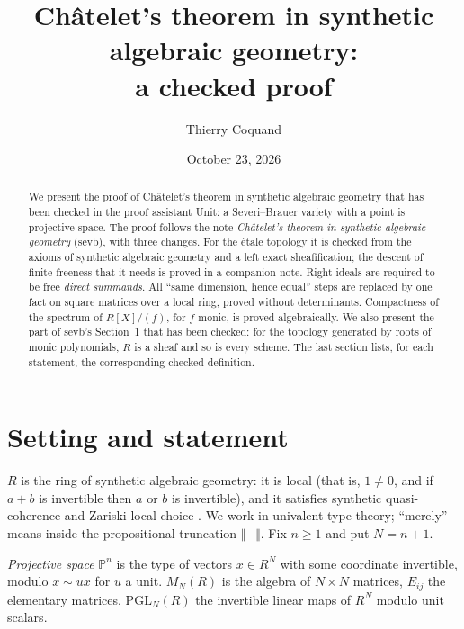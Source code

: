 \documentclass[11pt]{amsart}
\title{Ch\^atelet's theorem in synthetic algebraic geometry:\\ a checked proof}
\author{Thierry Coquand}
\date{October 23, 2026}
\theoremstyle{definition}
\theoremstyle{remark}
\newcommand{\Pn}{\mathbb{P}^n}
\newcommand{\M}{M_N(R)}
\newcommand{\PGL}{\mathrm{PGL}_N(R)}
\newcommand{\tr}[1]{\Vert #1\Vert}
\begin{document}
\begin{abstract}
We present the proof of Ch\^atelet's theorem in synthetic algebraic
geometry that has been checked in the proof assistant Unit: a
Severi--Brauer variety with a point is projective space. The proof follows
the note \emph{Ch\^atelet's theorem in synthetic algebraic geometry}
(sevb), with three changes. For the \'etale topology it is checked from
the axioms of synthetic algebraic geometry and a left exact
sheafification; the descent of finite freeness that it needs is proved in
a companion note. Right ideals are required to be free
\emph{direct summands}. All ``same dimension, hence equal'' steps are
replaced by one fact on square matrices over a local ring, proved without
determinants. Compactness of the spectrum of $R[X]/(f)$, for $f$ monic, is
proved algebraically. We also present the part of sevb's Section~1 that has
been checked: for the topology generated by roots of monic polynomials,
$R$ is a sheaf and so is every scheme. The last section lists, for each
statement, the corresponding checked definition.
\end{abstract}

\maketitle

\section{Setting and statement}

$R$ is the ring of synthetic algebraic geometry: it is local (that is, $1\neq
0$, and if $a+b$ is invertible then $a$ or $b$ is invertible), and it
satisfies synthetic quasi-coherence and Zariski-local choice
\cite{CCH24}. We work in univalent type theory; ``merely'' means inside the
propositional truncation $\tr{-}$. Fix $n\geq 1$ and put $N=n+1$.

\emph{Projective space} $\Pn$ is the type of vectors $x\in R^N$ with some
coordinate invertible, modulo $x\sim ux$ for $u$ a unit. $\M$ is the algebra
of $N\times N$ matrices, $E_{ij}$ the elementary matrices, $\PGL$ the
invertible linear maps of $R^N$ modulo unit scalars.
\end{document}
